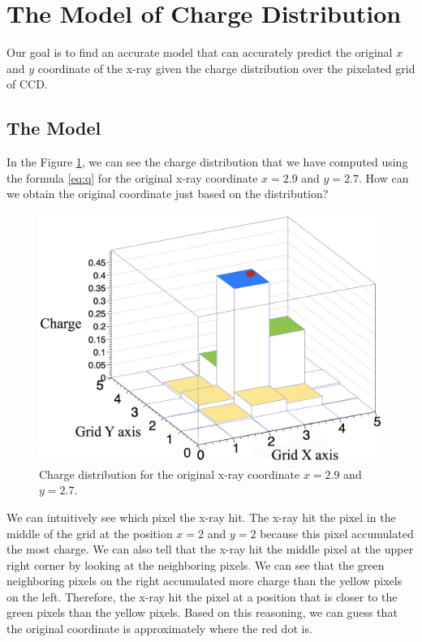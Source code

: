 \documentclass{article}
\begin{document}
\section{The Model of Charge Distribution}
Our goal is to find an accurate model that can accurately predict the original $x$ and $y$ coordinate of the x-ray given the charge distribution over the pixelated grid of CCD.

\subsection{The Model}
In the Figure \ref{fig:charge}, we can see the charge distribution that we have computed using the formula \ref{eq:q} for the original x-ray coordinate $x=2.9$ and $y=2.7$. How can we obtain the original coordinate just based on the distribution?

\begin{figure}[H]
    \centering
    \includegraphics[width=0.7\linewidth]{images/charge_distribution.png}
    \caption{Charge distribution for the original x-ray coordinate $x=2.9$ and $y=2.7$.}
    \label{fig:charge}
\end{figure}

We can intuitively see which pixel the x-ray hit. The x-ray hit the pixel in the middle of the grid at the position $x=2$ and $y=2$ because this pixel accumulated the most charge. We can also tell that the x-ray hit the middle pixel at the upper right corner by looking at the neighboring pixels. We can see that the green neighboring pixels on the right accumulated more charge than the yellow pixels on the left. Therefore, the x-ray hit the pixel at a position that is closer to the green pixels than the yellow pixels. Based on this reasoning, we can guess that the original coordinate is approximately where the red dot is.
\end{document}
